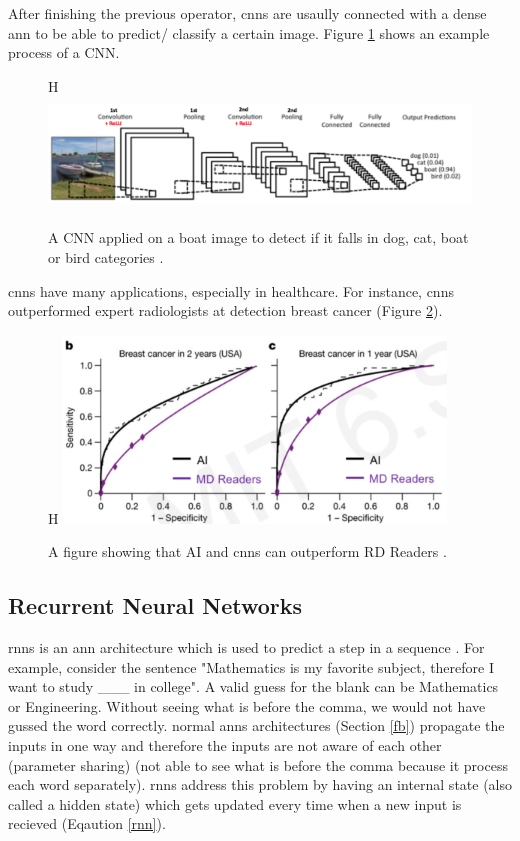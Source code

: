 \documentclass[runningheads]{llncs}
\begin{document}
After finishing the previous operator, \gls{cnns} are usaully connected with 
a dense \gls{ann} to be able to predict/ classify a certain image. Figure \ref{dcnnp} 
shows an example process of a CNN.

\begin{figure}{H}
    \label{dcnnp}
    \centering
    \includegraphics[height=3cm]{dcnnp}
    \caption{A CNN applied on a boat image to detect if it falls in 
    dog, cat, boat or bird categories \cite{cnnpro}.}
\end{figure}

\gls{cnns} have many applications, especially in healthcare. For instance, 
\gls{cnns} outperformed expert radiologists at detection breast cancer \cite{mckinney2020international} (Figure \ref{can}).

\begin{figure}{H}
    \label{can}
    \centering
    \includegraphics[height=5cm]{cancer}
    \caption{A figure showing that AI and \gls{cnns} can outperform RD Readers \cite{mitlecthree}.}
\end{figure}



\subsection{Recurrent Neural Networks}

\gls{rnns} is an \gls{ann} architecture which is used to predict a step in a sequence \cite{hochreiter1997long}.
For example, consider the sentence "Mathematics is my favorite subject, therefore I want to study \_\_\_ in college".
A valid guess for the blank can be Mathematics or Engineering. Without seeing
what is before the comma, we would not have gussed the word correctly.
normal \gls{anns} architectures (Section \ref{fb}) propagate the inputs in one way and therefore 
the inputs are not aware of each other (parameter sharing) 
(not able to see what is before the comma because it process each word separately).
\gls{rnns} address this problem by having an internal state (also called a hidden state) which gets 
updated every time when a new input is recieved (Eqaution \ref{rnn}). 
\end{document}
